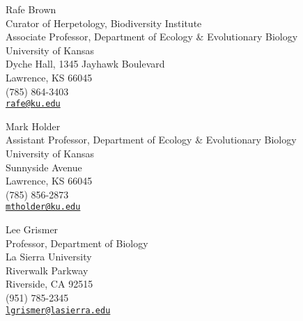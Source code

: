 Rafe Brown \\
\myIndent Curator of Herpetology, Biodiversity Institute \\
\myIndent Associate Professor, Department of Ecology \& Evolutionary Biology \\
\myIndent University of Kansas \\
\myIndent Dyche Hall, 1345 Jayhawk Boulevard \\
\myIndent Lawrence, KS 66045 \\
\myIndent (785) 864-3403 \\
\myIndent \href{mailto:rafe@ku.edu}{\tt rafe@ku.edu}

Mark Holder \\
\myIndent Assistant Professor, Department of Ecology \& Evolutionary Biology \\
\myIndent University of Kansas \\
 Sunnyside Avenue \\
\myIndent Lawrence, KS 66045 \\
\myIndent (785) 856-2873 \\
\myIndent \href{mailto:mtholder@ku.edu}{\tt mtholder@ku.edu}

Lee Grismer \\
\myIndent Professor, Department of Biology \\
\myIndent La Sierra University \\
 Riverwalk Parkway \\
\myIndent Riverside, CA 92515 \\
\myIndent (951) 785-2345 \\
\myIndent \href{mailto:lgrismer@lasierra.edu}{\tt lgrismer@lasierra.edu}

